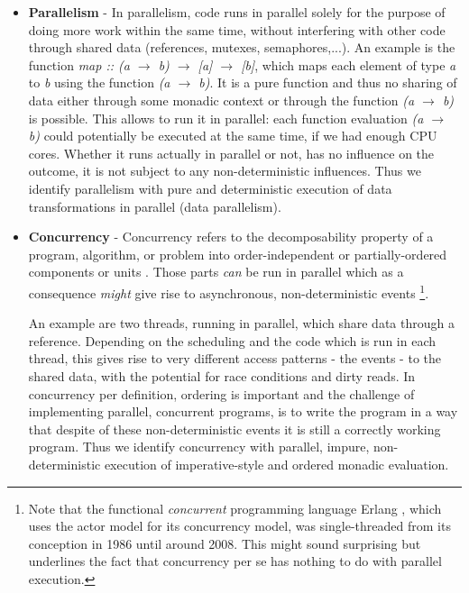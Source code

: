 \begin{itemize}
	\item \textbf{Parallelism} - In parallelism, code runs in parallel solely for the purpose of doing more work within the same time, without interfering with other code through shared data (references, mutexes, semaphores,...). An example is the function \textit{map :: (a $\rightarrow$ b) $\rightarrow$ [a] $\rightarrow$ [b]}, which maps each element of type \textit{a} to \textit{b} using the function \textit{(a $\rightarrow$ b)}. It is a pure function and thus no sharing of data either through some monadic context or through the function \textit{(a $\rightarrow$ b)} is possible. This allows to run it in parallel: each function evaluation \textit{(a $\rightarrow$ b)} could potentially be executed at the same time, if we had enough CPU cores. Whether it runs actually in parallel or not, has no influence on the outcome, it is not subject to any non-deterministic influences. Thus we identify parallelism with pure and deterministic execution of data transformations in parallel (data parallelism).

	\item \textbf{Concurrency} - Concurrency refers to the decomposability property of a program, algorithm, or problem into order-independent or partially-ordered components or units \cite{lamport_time_1978}. Those parts \textit{can} be run in parallel which as a consequence \textit{might} give rise to asynchronous, non-deterministic events \footnote{Note that the functional \textit{concurrent} programming language Erlang \cite{armstrong_erlang_2010}, which uses the actor model for its concurrency model, was single-threaded from its conception in 1986 until around 2008. This might sound surprising but underlines the fact that concurrency per se has nothing to do with parallel execution.}.

	An example are two threads, running in parallel, which share data through a reference. Depending on the scheduling and the code which is run in each thread, this gives rise to very different access patterns - the events - to the shared data, with the potential for race conditions and dirty reads. In concurrency per definition, ordering is important and the challenge of implementing parallel, concurrent programs, is to write the program in a way that despite of these non-deterministic events it is still a correctly working program. Thus we identify concurrency with parallel, impure, non-deterministic execution of imperative-style and ordered monadic evaluation.
\end{itemize}

